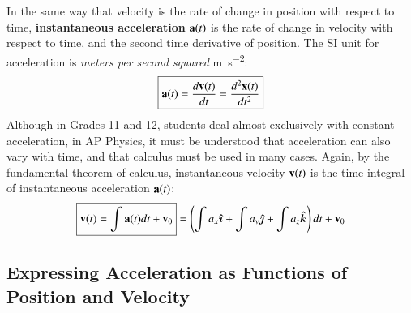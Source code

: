 \documentclass[11pt]{article}
\newcommand{\mb}[1]{\ensuremath\mathbf{#1}}
\begin{document}
In the same way that velocity is the rate of change in position with respect
to time, \textbf{instantaneous acceleration} $\mb{a}(t)$ is the rate of change
in velocity with respect to time, and the second time derivative of position.
The SI unit for acceleration is \emph{meters per second squared}
\si{\metre\per\second^2}:
\begin{equation}
  \boxed{\mb{a}(t)= \frac{d\mb{v}(t)}{dt}=\frac{d^2\mb{x}(t)}{dt^2}}
\end{equation}
Although in Grades 11 and 12, students deal almost exclusively with constant
acceleration, in AP Physics, it must be understood that acceleration can also
vary with time, and that calculus must be used in many cases.
Again, by the fundamental theorem of calculus, instantaneous velocity
$\mb{v}(t)$ is the time integral of instantaneous acceleration $\mb{a}(t)$:
\begin{equation}
  \boxed{\mb{v}(t)=\int\mb{a}(t)dt+\mb{v}_0}
  =
    \left(\int a_x\bm{\hat{\imath}} +
    \int a_y\bm{\hat{\jmath}} +
    \int a_z\bm{\hat{k}}\right) dt +\mb{v}_0
\end{equation}

\subsection{Expressing Acceleration as Functions of Position and Velocity}
\end{document}
